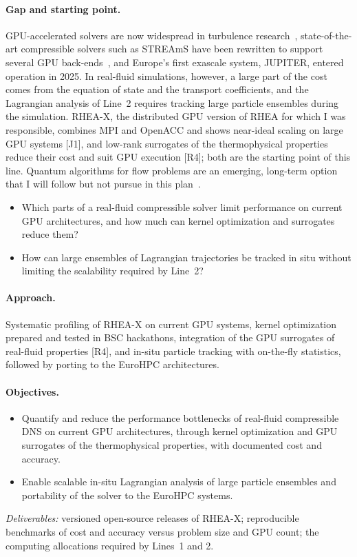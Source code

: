 \documentclass[11pt]{article}
\begin{document}
\paragraph{Gap and starting point.} GPU-accelerated solvers are now widespread in turbulence
research~\cite{Roccon2026}, state-of-the-art compressible solvers such as STREAmS have been
rewritten to support several GPU back-ends~\cite{Bernardini2021,Bernardini2023}, and Europe's
first exascale system, JUPITER, entered operation in 2025. In real-fluid simulations, however, a
large part of the cost comes from the equation of state and the transport coefficients, and the
Lagrangian analysis of Line~2 requires tracking large particle ensembles during the simulation.
RHEA-X, the distributed GPU version of RHEA for which I was responsible, combines MPI and OpenACC
and shows near-ideal scaling on large GPU systems [J1], and low-rank surrogates of the
thermophysical properties reduce their cost and suit GPU execution [R4]; both are the starting
point of this line. Quantum algorithms for flow problems are an emerging, long-term option that I
will follow but not pursue in this plan~\cite{Bharadwaj2023}.
\begin{itemize}
  \item[\textbf{Q3.1}] Which parts of a real-fluid compressible solver limit performance on
  current GPU architectures, and how much can kernel optimization and surrogates reduce them?
  \item[\textbf{Q3.2}] How can large ensembles of Lagrangian trajectories be tracked in situ
  without limiting the scalability required by Line~2?
\end{itemize}
\paragraph{Approach.} Systematic profiling of RHEA-X on current GPU systems, kernel optimization
prepared and tested in BSC hackathons, integration of the GPU surrogates of real-fluid
properties [R4], and in-situ particle tracking with on-the-fly statistics, followed by porting to
the EuroHPC architectures.
\paragraph{Objectives.}
\begin{itemize}
  \item[\textbf{O7.}] Quantify and reduce the performance bottlenecks of real-fluid compressible
  DNS on current GPU architectures, through kernel optimization and GPU surrogates of the
  thermophysical properties, with documented cost and accuracy.
  \item[\textbf{O8.}] Enable scalable in-situ Lagrangian analysis of large particle ensembles
  and portability of the solver to the EuroHPC systems.
\end{itemize}
\emph{Deliverables:} versioned open-source releases of RHEA-X; reproducible benchmarks of cost and
accuracy versus problem size and GPU count; the computing allocations required by Lines~1 and 2.
\end{document}
